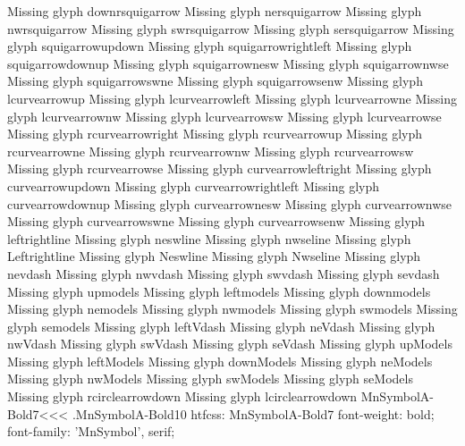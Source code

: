 Missing glyph	downrsquigarrow
Missing glyph	nersquigarrow
Missing glyph	nwrsquigarrow
Missing glyph	swrsquigarrow
Missing glyph	sersquigarrow
Missing glyph	squigarrowupdown
Missing glyph	squigarrowrightleft
Missing glyph	squigarrowdownup
Missing glyph	squigarrownesw
Missing glyph	squigarrownwse
Missing glyph	squigarrowswne
Missing glyph	squigarrowsenw
Missing glyph	lcurvearrowup
Missing glyph	lcurvearrowleft
Missing glyph	lcurvearrowne
Missing glyph	lcurvearrownw
Missing glyph	lcurvearrowsw
Missing glyph	lcurvearrowse
Missing glyph	rcurvearrowright
Missing glyph	rcurvearrowup
Missing glyph	rcurvearrowne
Missing glyph	rcurvearrownw
Missing glyph	rcurvearrowsw
Missing glyph	rcurvearrowse
Missing glyph	curvearrowleftright
Missing glyph	curvearrowupdown
Missing glyph	curvearrowrightleft
Missing glyph	curvearrowdownup
Missing glyph	curvearrownesw
Missing glyph	curvearrownwse
Missing glyph	curvearrowswne
Missing glyph	curvearrowsenw
Missing glyph	leftrightline
Missing glyph	neswline
Missing glyph	nwseline
Missing glyph	Leftrightline
Missing glyph	Neswline
Missing glyph	Nwseline
Missing glyph	nevdash
Missing glyph	nwvdash
Missing glyph	swvdash
Missing glyph	sevdash
Missing glyph	upmodels
Missing glyph	leftmodels
Missing glyph	downmodels
Missing glyph	nemodels
Missing glyph	nwmodels
Missing glyph	swmodels
Missing glyph	semodels
Missing glyph	leftVdash
Missing glyph	neVdash
Missing glyph	nwVdash
Missing glyph	swVdash
Missing glyph	seVdash
Missing glyph	upModels
Missing glyph	leftModels
Missing glyph	downModels
Missing glyph	neModels
Missing glyph	nwModels
Missing glyph	swModels
Missing glyph	seModels
Missing glyph	rcirclearrowdown
Missing glyph	lcirclearrowdown
\<MnSymbolA-Bold7\><<<
.MnSymbolA-Bold10
htfcss:  MnSymbolA-Bold7  font-weight: bold; font-family: 'MnSymbol', serif;

